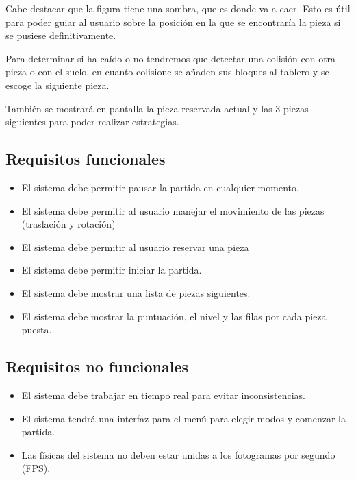 \documentclass{article}
\begin{document}

Cabe destacar que la figura tiene una sombra, que es donde va a caer. Esto es
 útil para poder guiar al usuario sobre la posición en la que se encontraría
  la pieza si se pusiese definitivamente.

Para determinar si ha caído o no tendremos que detectar una colisión con otra
 pieza o con el suelo, en cuanto colisione se añaden sus bloques al tablero y
 se escoge la siguiente pieza.

También se mostrará en pantalla la pieza reservada actual y las 3 piezas siguientes para poder realizar estrategias.


\subsection{Requisitos funcionales}
\begin{itemize}
    \item El sistema debe permitir pausar la partida en cualquier
    momento.
    \item El sistema debe permitir al usuario manejar el movimiento de
    las piezas (traslación y rotación)
    \item El sistema debe permitir al usuario reservar una pieza
    \item El sistema debe permitir iniciar la partida.
    \item El sistema debe mostrar una lista de piezas siguientes.
    \item El sistema debe mostrar la puntuación, el nivel y las filas por cada pieza puesta.
\end{itemize}
\subsection{Requisitos no funcionales}
\begin{itemize}
    \item El sistema debe trabajar en tiempo real para evitar inconsistencias.
    \item El sistema tendrá una interfaz para el menú para elegir modos y comenzar la partida.
    \item Las físicas del sistema no deben estar unidas a los fotogramas por segundo (FPS).

\end{itemize}
\end{document}
